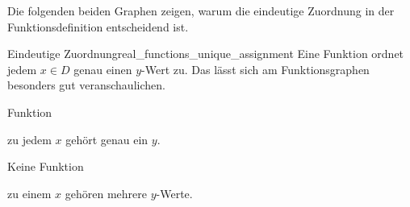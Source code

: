 \par\medskip\noindent\begin{minipage}{\linewidth}
Die folgenden beiden Graphen zeigen, warum die eindeutige Zuordnung in der
Funktionsdefinition entscheidend ist.
\par\smallskip
\begin{KeyPointBox}{Eindeutige Zuordnung}{real_functions_unique_assignment}
  Eine Funktion ordnet jedem $x\in D$ genau einen $y$-Wert zu.
  Das lässt sich am Funktionsgraphen besonders gut veranschaulichen.
  \par\smallskip
  \begin{minipage}[t]{0.48\linewidth}
    \centering
    \par\smallskip
    \enspace \textcolor{THMBlue}{Funktion}
    \par
    zu jedem $x$ gehört genau ein $y$.
  \end{minipage}\hfill
  \begin{minipage}[t]{0.48\linewidth}
    \centering
    \par\smallskip
    \enspace \textcolor{red!75!black}{Keine Funktion}
    \par
    zu einem $x$ gehören mehrere $y$-Werte.
  \end{minipage}
\end{KeyPointBox}
\end{minipage}

